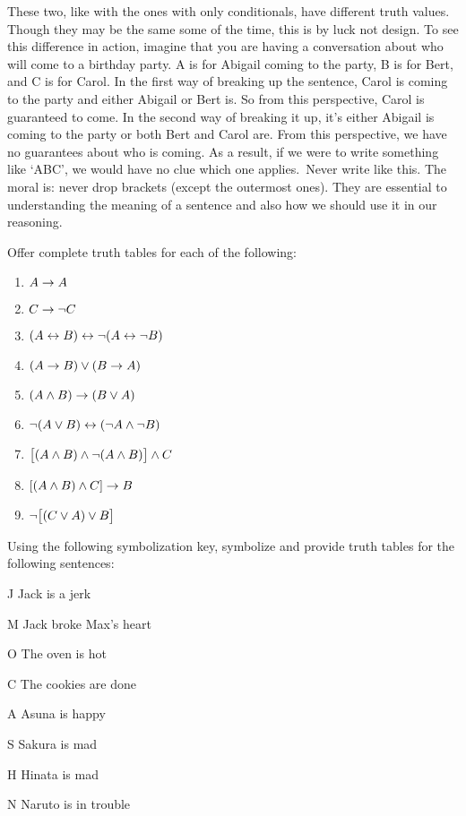 These two, like with the ones with only conditionals, have different truth values. Though they may be the same some of the time, this is by luck not design. To see this difference in action, imagine that you are having a conversation about who will come to a birthday party. A is for Abigail coming to the party, B is for Bert, and C is for Carol. In the first way of breaking up the sentence, Carol is coming to the party and either Abigail or Bert is. So from this perspective, Carol is guaranteed to come. In the second way of breaking it up, it's either Abigail is coming to the party or both Bert and Carol are. From this perspective, we have no guarantees about who is coming. As a result, if we were to write something like `A\eor B\eand C', we would have no clue which one applies. Never write like this. The moral is: never drop brackets (except the outermost ones). They are essential to understanding the meaning of a sentence and also how we should use it in our reasoning. 

\practiceproblems\label{pr.TT.TTorC}
\problempart
Offer complete truth tables for each of the following:
\begin{enumerate}
\item $A \rightarrow A$ %
\item $C \rightarrow\neg C$ %
\item $(A \leftrightarrow B) \leftrightarrow \neg(A\leftrightarrow \neg B)$ %
\item $(A \rightarrow B) \vee (B \rightarrow A)$ %
\item $(A \wedge B) \rightarrow (B \vee A)$  %
\item $\neg(A \vee B) \leftrightarrow (\neg A \wedge \neg B)$ %
\item $\bigl[(A\wedge B) \wedge\neg(A\wedge B)\bigr] \wedge C$ %
\item $[(A \wedge B) \wedge C] \rightarrow B$ %
\item $\neg\bigl[(C\vee A) \vee B\bigr]$ %
\end{enumerate}
\problempart
Using the following symbolization key, symbolize and provide truth tables for the following sentences:
	\begin{ekey}
		\item[J]Jack is a jerk
		\item[M]Jack broke Max's heart
		\item[O] The oven is hot
		\item[C] The cookies are done
		\item[A] Asuna is happy
		\item[S] Sakura is mad
		\item[H] Hinata is mad
		\item[N] Naruto is in trouble
	\end{ekey}

